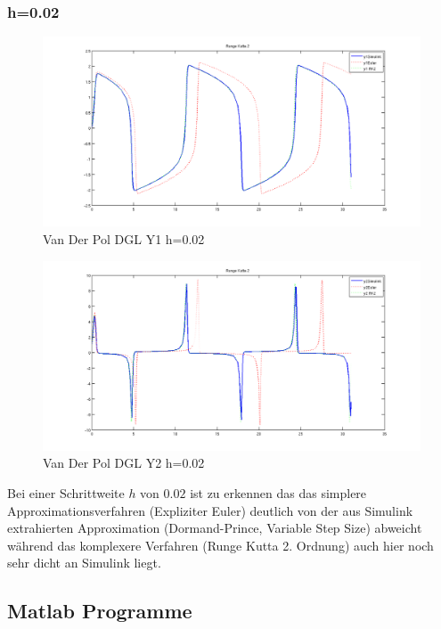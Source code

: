 \documentclass[10pt]{scrartcl}
\begin{document}
	\subsubsection{h=0.02}	
		\begin{figure}[H]
			\centering	
			\includegraphics[width=\textwidth]{vanDerPolY102.png}
            \caption{Van Der Pol DGL Y1 h=0.02}
            \label{pic:y2vdp02}
		\end{figure} 
		
		\begin{figure}[H]
			\centering	
			\includegraphics[width=\textwidth]{vanDerPolY202.png}
            \caption{Van Der Pol DGL Y2 h=0.02}
            \label{pic:y2vdp02}
		\end{figure}		
		
	Bei einer Schrittweite $h$ von $0.02$ ist zu erkennen das das simplere Approximationsverfahren (Expliziter Euler) deutlich von der aus Simulink extrahierten Approximation (Dormand-Prince, Variable Step Size) abweicht während das komplexere Verfahren (Runge Kutta 2. Ordnung) auch hier noch sehr dicht an Simulink liegt.
	
	\subsection{Matlab Programme}
	
	
		
	
\end{document}
